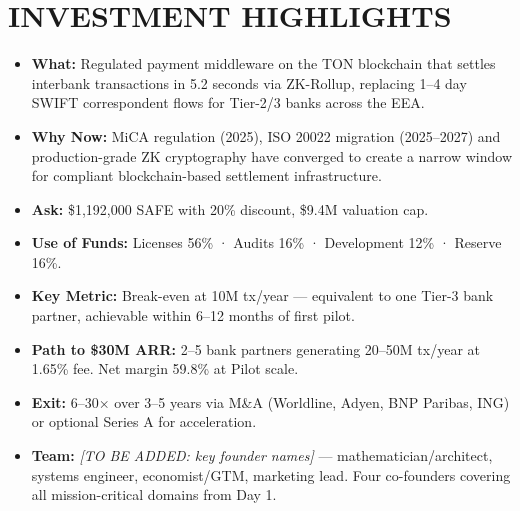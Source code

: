 \documentclass[11pt,a4paper]{article}
\begin{document}
\section*{INVESTMENT HIGHLIGHTS}
\vspace{0.4em}

\begin{tcolorbox}[keymetric]
\begin{itemize}[leftmargin=1.5em, itemsep=8pt, parsep=0pt]
\item \textbf{What:} Regulated payment middleware on the TON blockchain that settles interbank transactions in 5.2 seconds via ZK-Rollup, replacing 1--4 day SWIFT correspondent flows for Tier-2/3 banks across the EEA.

\item \textbf{Why Now:} MiCA regulation (2025), ISO 20022 migration (2025--2027) and production-grade ZK cryptography have converged to create a narrow window for compliant blockchain-based settlement infrastructure.

\item \textbf{Ask:} \$1,192,000 SAFE with 20\% discount, \$9.4M valuation cap.

\item \textbf{Use of Funds:} Licenses 56\% · Audits 16\% · Development 12\% · Reserve 16\%.

\item \textbf{Key Metric:} Break-even at 10M tx/year --- equivalent to one Tier-3 bank partner, achievable within 6--12 months of first pilot.

\item \textbf{Path to \$30M ARR:} 2--5 bank partners generating 20--50M tx/year at 1.65\% fee. Net margin 59.8\% at Pilot scale.

\item \textbf{Exit:} 6--30$\times$ over 3--5 years via M\&A (Worldline, Adyen, BNP Paribas, ING) or optional Series A for acceleration.

\item \textbf{Team:} \textit{[TO BE ADDED: key founder names]} --- mathematician/architect, systems engineer, economist/GTM, marketing lead. Four co-founders covering all mission-critical domains from Day 1.
\end{itemize}
\end{tcolorbox}

\newpage
\thispagestyle{fancy}
\tableofcontents
\newpage
\end{document}
